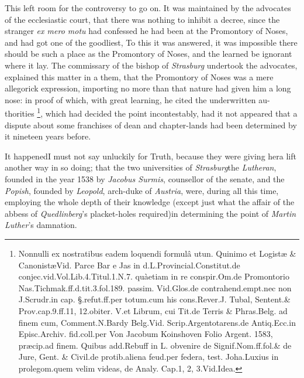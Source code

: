 \documentclass{article}
\begin{document}
This left room for the controversy to go on. It was maintained by the advocates
of the ecclesiastic court, that there was nothing to inhibit a decree, since
the stranger \textit{ex mero motu} had confessed he had been at the Promontory of
Noses, and had got one of the goodliest, \etc\etc\break
\tsk To this
it was answered, it was impossible there should be such a place as the
Promontory of Noses, and the learned be ignorant where it lay. The commissary
of the bishop of \textit{Strasburg} undertook the
advocates, explained this matter in a\break
{}
them, that the Promontory of Noses was
a mere allegorick expression, importing no more than that nature
had given him a long nose: in proof of which, with great learning, he cited the
underwritten au-\break
thorities \footnote{Nonnulli ex nostratibus eadem loquendi \vrule height 12pt width 0pt
formulâ utun. Quinimo et Logistæ \& Canonistæ\tsh Vid.\@
Parce Bar e Jas in d.\@ L.\@ Provincial.Constitut.\break de
conjec.\@ vid.\@ Vol.\@ Lib.\@ 4.\@ Titul.\@ 1.\@ N.\@ 7.\@
quà\break etiam in re conspir.\@ Om.\@ de Promontorio
Nas.\break Tichmak.\@ ff.\@ d.\@ tit.\@ 3.\@ fol.\@ 189.\@
passim. Vid.\@ Glos.\break de contrahend.\@ empt.\etc nec
non J.\@ Scrudr.\@ in cap.\break 
§.\@ refut.\@ ff.\@ per totum.\@ cum his cons.\@ Rever.\@ J.\break
Tubal, Sentent.\@ \& Prov.\@ cap.\@ 9.\@ ff.\@ 11, 12.\@ obiter.\break  
V.\@ et Librum, cui Tit.\@ de Terris \& Phras.\@ Belg.\break
ad finem cum, Comment.\@ N.\@ Bardy Belg.\@ Vid.\break
Scrip.\@ Argentotarens.\@ de Antiq.\@ Ecc.\@ in Episc.\@ Ar\-chiv.\@
fid.\@ coll.\@ per Von Jacobum Koinshoven Folio Argent.\@
1583, præcip.\@ ad finem.  Quibus add.\@ Rebuff in L.\@
obvenire de Signif.\@ Nom.\@ ff.\@ fol.\@ \& de Jure, Gent.\@
\& Civil.\@ de protib.\@ aliena feud.\@ per federa, test.\@
Joha.\@ Luxius in prolegom.\@ quem velim videas, de Analy.\@
Cap.\@ 1, 2, 3.\@ Vid.\@ Idea.},
which had decided the point
incontestably, had it not appeared that a dispute
about some franchises of dean and chapter-lands had been determined by it
nineteen years before.

It happened\tsk I must not say unluckily for Truth, because
they were giving her\break a lift another way in so doing;
that the two universities of \textit{Strasburg}\tsk the
\textit{Luthe\-ran}, founded in the year 1538 by
\textit{Jacobus Surmis}, counsellor of the senate,\tsk
and\break
the \textit{Popish}, founded by \textit{Leopold}, arch-duke
of \textit{Austria}, were, during all this time, employing
the whole depth of their know\-ledge (except just what the
affair of the abbess of \textit{Quedlinberg}’s placket-holes
required)\tsh in determining the point of \textit{Martin
Luther}’s damnation.
\end{document}
